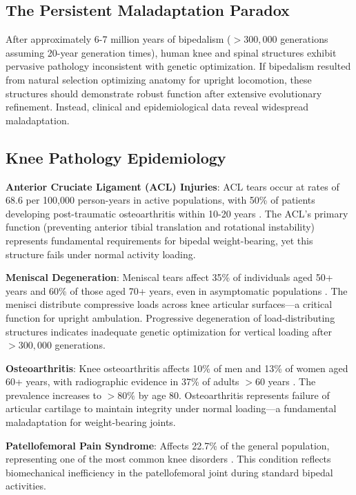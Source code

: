 \subsection{The Persistent Maladaptation Paradox}

After approximately 6-7 million years of bipedalism ($>300,000$ generations assuming 20-year generation times), human knee and spinal structures exhibit pervasive pathology inconsistent with genetic optimization. If bipedalism resulted from natural selection optimizing anatomy for upright locomotion, these structures should demonstrate robust function after extensive evolutionary refinement. Instead, clinical and epidemiological data reveal widespread maladaptation.

\subsection{Knee Pathology Epidemiology}

\textbf{Anterior Cruciate Ligament (ACL) Injuries}: ACL tears occur at rates of 68.6 per 100,000 person-years in active populations, with 50\% of patients developing post-traumatic osteoarthritis within 10-20 years \citep{sanders2016incidence,lohmander2007high}. The ACL's primary function (preventing anterior tibial translation and rotational instability) represents fundamental requirements for bipedal weight-bearing, yet this structure fails under normal activity loading.

\textbf{Meniscal Degeneration}: Meniscal tears affect 35\% of individuals aged 50+ years and 60\% of those aged 70+ years, even in asymptomatic populations \citep{englund2008incidental}. The menisci distribute compressive loads across knee articular surfaces—a critical function for upright ambulation. Progressive degeneration of load-distributing structures indicates inadequate genetic optimization for vertical loading after $>300,000$ generations.

\textbf{Osteoarthritis}: Knee osteoarthritis affects 10\% of men and 13\% of women aged 60+ years, with radiographic evidence in 37\% of adults $>$60 years \citep{zhang2010prevalence}. The prevalence increases to $>80\%$ by age 80. Osteoarthritis represents failure of articular cartilage to maintain integrity under normal loading—a fundamental maladaptation for weight-bearing joints.

\textbf{Patellofemoral Pain Syndrome}: Affects 22.7\% of the general population, representing one of the most common knee disorders \citep{smith2018incidence}. This condition reflects biomechanical inefficiency in the patellofemoral joint during standard bipedal activities.

